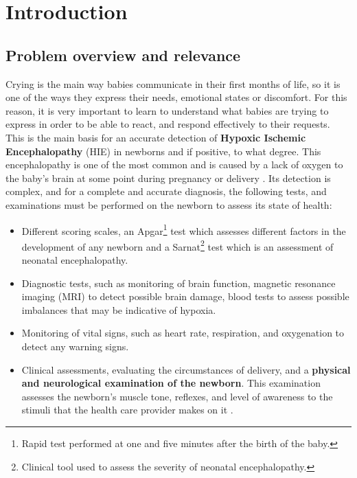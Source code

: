 %
\chapter{Introduction}
\label{ch::chapter1}

\section{Problem overview and relevance}
Crying is the main way babies communicate in their first months of life, so it is one of the ways they express their needs, emotional states or discomfort. For this reason, it is very important to learn to understand what babies are trying to express in order to be able to react, and respond effectively to their requests. This is the main basis for an accurate detection of \textbf{Hypoxic Ischemic Encephalopathy} (HIE) in newborns and if positive, to what degree. This encephalopathy is one of the most common and is caused by a lack of oxygen to the baby’s brain at some point during pregnancy or delivery \cite{riley_neonatal}. Its detection is complex, and for a complete and accurate diagnosis, the following tests, and examinations must be performed on the newborn to assess its state of health:
\begin{itemize}
    \item Different scoring scales, an Apgar\footnote{Rapid test performed at one and five minutes after the birth of the baby.\cite{medlineplus_apgar}} test which assesses different factors in the development of any newborn and a Sarnat\footnote{Clinical tool used to assess the severity of neonatal encephalopathy.\cite{modified_sarnat_score}} test which is an assessment of neonatal encephalopathy.
    \item Diagnostic tests, such as monitoring of brain function, magnetic resonance imaging (MRI) to detect possible brain damage, blood tests to assess possible imbalances that may be indicative of hypoxia.
    \item Monitoring of vital signs, such as heart rate, respiration, and oxygenation to detect any warning signs.
    \item Clinical assessments, evaluating the circumstances of delivery, and a \textbf{physical and neurological examination of the newborn}. This examination assesses the newborn's muscle tone, reflexes, and level of awareness to the stimuli that the health care provider makes on it \cite{clarke_management_2017}.
\end{itemize}

